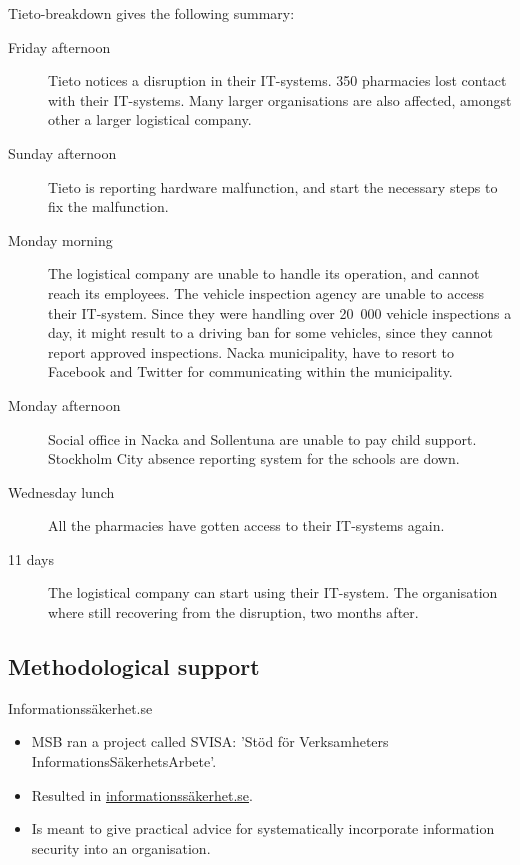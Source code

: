 \documentclass{beamer}
\begin{document}
\begin{frame}[allowframebreaks]{Tieto-breakdown}
  \citet{Lindkvist2012tdf} gives the following summary:
  \begin{description}
    \item[Friday afternoon] Tieto notices a disruption in their IT-systems.
      350 pharmacies lost contact with their IT-systems.
      Many larger organisations are also affected, amongst other a larger
      logistical company.

    \item[Sunday afternoon] Tieto is reporting hardware malfunction, and start
     the necessary steps to fix the malfunction.

    \item[Monday morning] The logistical company are unable to handle its
      operation, and cannot reach its employees.
      The vehicle inspection agency are unable to access their IT-system. Since
      they were handling over 20\, 000 vehicle inspections a day, it might
      result to a driving ban for some vehicles, since they cannot report
      approved inspections.
      Nacka municipality, have to resort to Facebook and Twitter for
      communicating within the municipality.

    \item[Monday afternoon] Social office in Nacka and Sollentuna are unable to
      pay child support.
      Stockholm City absence reporting system for the schools are down.

    \item[Wednesday lunch] All the pharmacies have gotten access to their
      IT-systems again.

    \item[11 days] The logistical company can start using their IT-system.
      The organisation where still recovering from the disruption, two months
      after.
  \end{description}
\end{frame}

\subsection{Methodological support}

\begin{frame}{Informationssäkerhet.se}
  \begin{itemize}
    \item MSB ran a project called SVISA\@: 'Stöd för Verksamheters 
      InformationsSäkerhetsArbete'.

    \item Resulted in \url{informationssäkerhet.se}.

    \item Is meant to give practical advice for systematically incorporate
      information security into an organisation.
  \end{itemize}
\end{frame}
\end{document}
